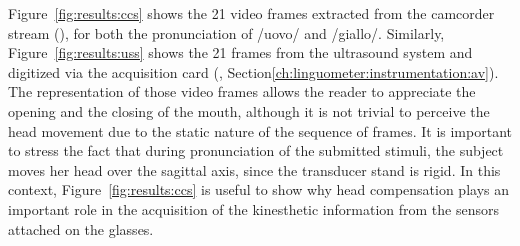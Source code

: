 Figure~\ref{fig:results:ccs} shows the 21
video frames extracted from the camcorder stream (), for both the
pronunciation of /uovo/ and /giallo/.
Similarly, Figure~\ref{fig:results:uss}
shows the 21 frames from the ultrasound system and digitized via the acquisition
card (, Section\ref{ch:linguometer:instrumentation:av}).
The representation of those video frames allows the reader to appreciate the
opening and the closing of the mouth, although it is not trivial to perceive
the head movement due to the static nature of the sequence of frames.
It is important to stress the fact that during pronunciation of the submitted
stimuli, the subject moves her head over the sagittal axis, since the
 transducer
stand is rigid. 
In this context, Figure~\ref{fig:results:ccs} is useful to show 
why head compensation plays an important role in the acquisition of the 
kinesthetic information from the sensors attached on the glasses.




\clearpage

